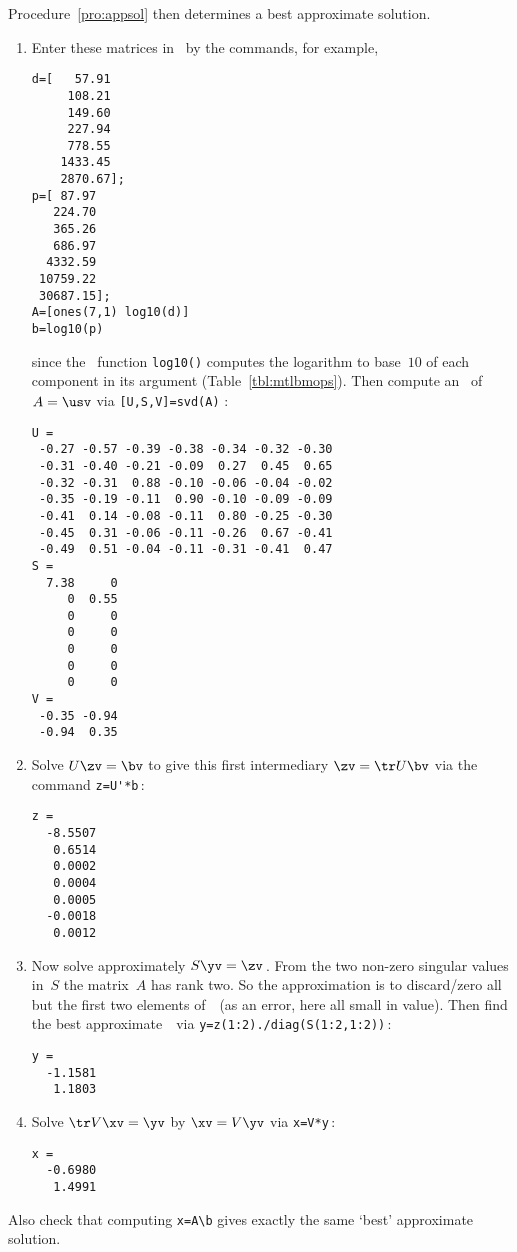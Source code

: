\begin{example}
\begin{solution}
Procedure~\ref{pro:appsol} then determines a best approximate solution.
\begin{enumerate}
\item Enter these matrices in \script\ by the commands, for example,
\setbox\ajrqrbox\hbox{}%
\marginpar{\usebox{\ajrqrbox\\[2ex]}}%
\begin{verbatim}
d=[   57.91
     108.21
     149.60
     227.94
     778.55
    1433.45
    2870.67];
p=[ 87.97
   224.70
   365.26
   686.97
  4332.59
 10759.22
 30687.15];
A=[ones(7,1) log10(d)]
b=log10(p)
\end{verbatim}
since the \script\ function \verb|log10()| computes the logarithm to base~\(10\) of each component in its argument (Table~\ref{tbl:mtlbmops}).
Then compute an \svd\ of \(A=\usv\) via \verb|[U,S,V]=svd(A)| \twodp:
\begin{verbatim}
U =
 -0.27 -0.57 -0.39 -0.38 -0.34 -0.32 -0.30
 -0.31 -0.40 -0.21 -0.09  0.27  0.45  0.65
 -0.32 -0.31  0.88 -0.10 -0.06 -0.04 -0.02
 -0.35 -0.19 -0.11  0.90 -0.10 -0.09 -0.09
 -0.41  0.14 -0.08 -0.11  0.80 -0.25 -0.30
 -0.45  0.31 -0.06 -0.11 -0.26  0.67 -0.41
 -0.49  0.51 -0.04 -0.11 -0.31 -0.41  0.47
S =
  7.38     0
     0  0.55
     0     0
     0     0
     0     0
     0     0
     0     0
V =
 -0.35 -0.94
 -0.94  0.35
\end{verbatim}
\item Solve \(U\zv=\bv\) to give this first intermediary \(\zv=\tr U\bv\) via the command \verb|z=U'*b|\,:
\begin{verbatim}
z =
  -8.5507
   0.6514
   0.0002
   0.0004
   0.0005
  -0.0018
   0.0012
\end{verbatim}

\item Now solve approximately \(S\yv=\zv\)\,. 
From the two non-zero singular values in~\(S\) the matrix~\(A\) has rank two.
So the approximation is to discard\slash zero all but the first two elements of~\zv\ (as an error, here all small in value).
Then find the best approximate~\yv\ via \verb|y=z(1:2)./diag(S(1:2,1:2))|\,:
\begin{verbatim}
y =
  -1.1581
   1.1803
\end{verbatim}

\item Solve \(\tr V\xv=\yv\) by \(\xv=V\yv\) via \verb|x=V*y|\,:
\begin{verbatim}
x =
  -0.6980
   1.4991
\end{verbatim}
\end{enumerate}
Also check that computing \verb|x=A\b| gives exactly the same `best' approximate solution. 


\end{solution}
\end{example}

